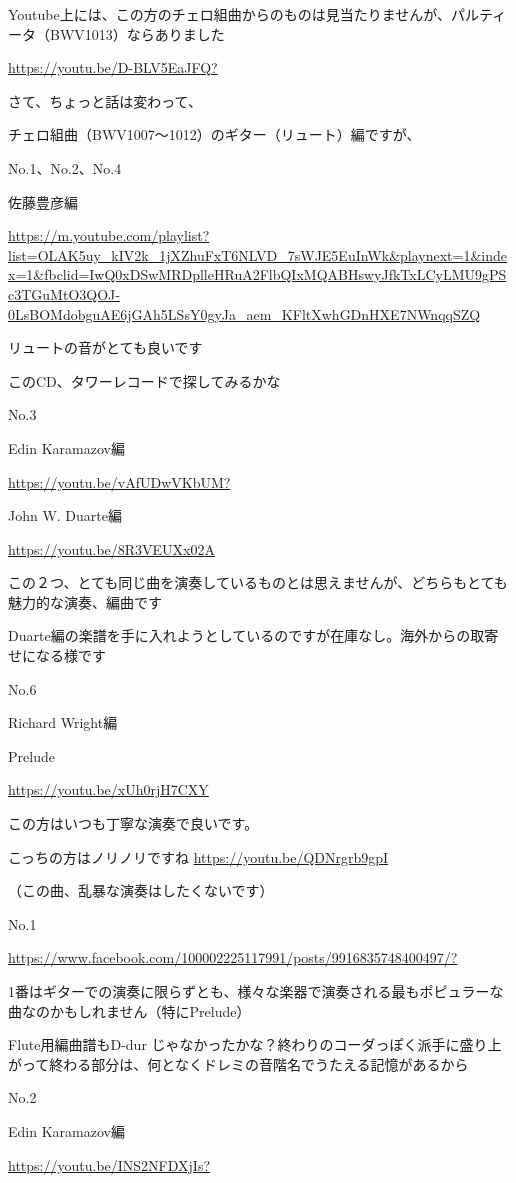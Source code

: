 Youtube上には、この方のチェロ組曲からのものは見当たりませんが、パルティータ（BWV1013）ならありました

\url{https://youtu.be/D-BLV5EaJFQ?}

さて、ちょっと話は変わって、

チェロ組曲（BWV1007〜1012）のギター（リュート）編ですが、

No.1、No.2、No.4

佐藤豊彦編

\url{https://m.youtube.com/playlist?list=OLAK5uy_kIV2k_1jXZhuFxT6NLVD_7sWJE5EuInWk&playnext=1&index=1&fbclid=IwQ0xDSwMRDplleHRuA2FlbQIxMQABHswyJfkTxLCyLMU9gPSc3TGuMtO3QOJ-0LsBOMdobguAE6jGAh5LSsY0gyJa_aem_KFltXwhGDnHXE7NWnqqSZQ}

リュートの音がとても良いです

このCD、タワーレコードで探してみるかな

No.3

Edin Karamazov編

\url{https://youtu.be/vAfUDwVKbUM?}

John W. Duarte編

\url{https://youtu.be/8R3VEUXx02A}

この２つ、とても同じ曲を演奏しているものとは思えませんが、どちらもとても魅力的な演奏、編曲です

Duarte編の楽譜を手に入れようとしているのですが在庫なし。海外からの取寄せになる様です

No.6

Richard Wright編

Prelude

\url{https://youtu.be/xUh0rjH7CXY}

この方はいつも丁寧な演奏で良いです。

こっちの方はノリノリですね \url{https://youtu.be/QDNrgrb9gpI}

（この曲、乱暴な演奏はしたくないです）

No.1

\url{https://www.facebook.com/100002225117991/posts/9916835748400497/?}

1番はギターでの演奏に限らずとも、様々な楽器で演奏される最もポピュラーな曲なのかもしれません（特にPrelude）

Flute用編曲譜もD-dur じゃなかったかな？終わりのコーダっぽく派手に盛り上がって終わる部分は、何となくドレミの音階名でうたえる記憶があるから

No.2

Edin Karamazov編

\url{https://youtu.be/INS2NFDXjIs?}

